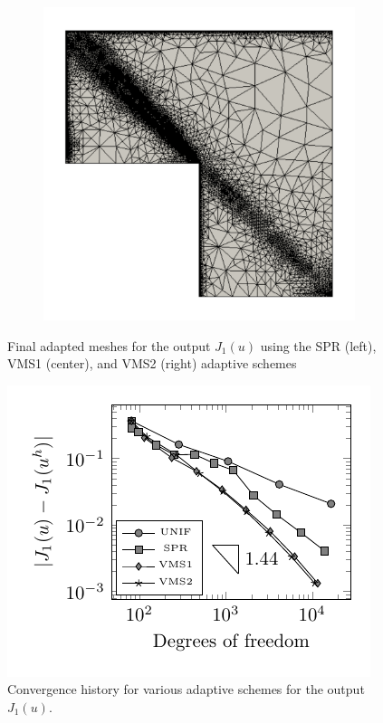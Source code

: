 \begin{figure}[hbt!]
\begin{subfigure}{.3\textwidth}
\end{subfigure}%
\begin{subfigure}{.3\textwidth}
\centering
\includegraphics[width=.99\linewidth]{img/vms_lshape_global_vms2_final}
\end{subfigure}
\caption{Final adapted meshes for the output $J_1(u)$ using
the SPR (left), VMS1 (center), and VMS2 (right) adaptive schemes}
\label{fig:J1_meshes}
\end{figure}

\begin{figure}[hbt!]
\centering
\includegraphics[width=.75\linewidth]{img/vms_lshape_global_convergence}
\caption{Convergence history for various adaptive schemes for
the output $J_1(u)$.}
\label{fig:J1_convergence}
\end{figure}

